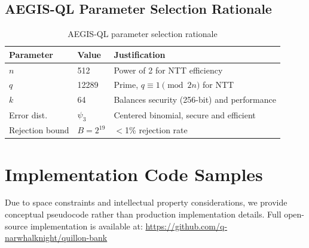 \documentclass[11pt,a4paper]{article}
\begin{document}
\subsection{AEGIS-QL Parameter Selection Rationale}

\begin{table}[h]
\centering
\small
\begin{tabular}{@{}lll@{}}
\toprule
\textbf{Parameter} & \textbf{Value} & \textbf{Justification} \\ \midrule
$n$ & 512 & Power of 2 for NTT efficiency \\
$q$ & 12289 & Prime, $q \equiv 1 \pmod{2n}$ for NTT \\
$k$ & 64 & Balances security (256-bit) and performance \\
Error dist. & $\psi_3$ & Centered binomial, secure and efficient \\
Rejection bound & $B = 2^{19}$ & $<$1\% rejection rate \\ \bottomrule
\end{tabular}
\caption{AEGIS-QL parameter selection rationale}
\end{table}

\section{Implementation Code Samples}

Due to space constraints and intellectual property considerations, we provide conceptual pseudocode rather than production implementation details. Full open-source implementation is available at: \url{https://github.com/q-narwhalknight/quillon-bank}
\end{document}
